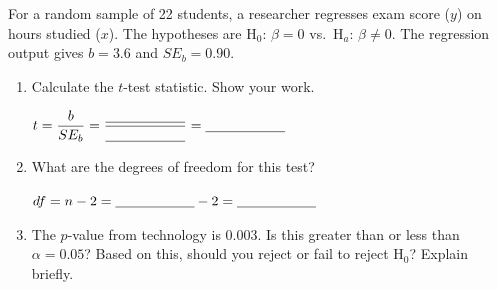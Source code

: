 \documentclass[10pt]{article}
\begin{document}
\namedateperiod

\vspace{0.15in}

For a random sample of 22 students, a researcher regresses exam score ($y$) on hours
studied ($x$). The hypotheses are H$_0$: $\beta = 0$ vs.\ H$_a$: $\beta \ne 0$.
The regression output gives $b = 3.6$ and $SE_b = 0.90$.

\begin{enumerate}

  \item Calculate the $t$-test statistic. Show your work.

        \vspace{0.05in}
        $t = \dfrac{b}{SE_b} = \dfrac{\blank{2cm}}{\blank{2cm}} = \blank{2cm}$

        \vspace{0.15in}

  \item What are the degrees of freedom for this test?

        \vspace{0.05in}
        $df = n - 2 = \blank{2cm} - 2 = \blank{2cm}$

        \vspace{0.15in}

  \item The $p$-value from technology is 0.003. Is this greater than or less than
        $\alpha = 0.05$? Based on this, should you reject or fail to reject H$_0$?
        Explain briefly.

        \vspace{0.05in}

\end{enumerate}
\end{document}
